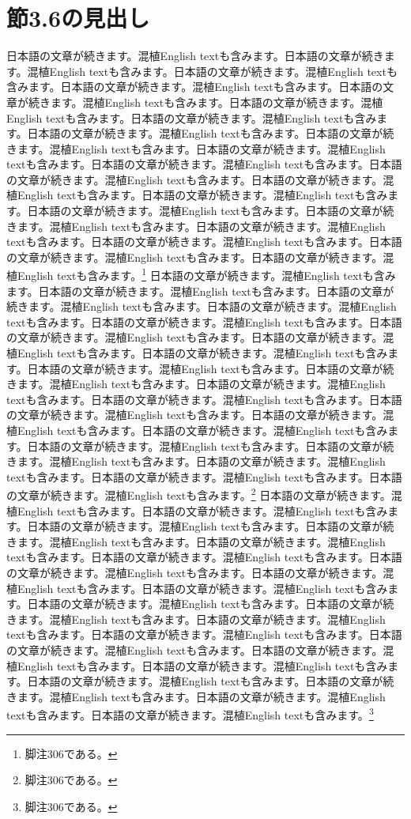 \documentclass[pdflatex,book]{jlreq}
\begin{document}
\section{節3.6の見出し}
日本語の文章が続きます。混植English textも含みます。日本語の文章が続きます。混植English textも含みます。日本語の文章が続きます。混植English textも含みます。日本語の文章が続きます。混植English textも含みます。日本語の文章が続きます。混植English textも含みます。日本語の文章が続きます。混植English textも含みます。日本語の文章が続きます。混植English textも含みます。日本語の文章が続きます。混植English textも含みます。日本語の文章が続きます。混植English textも含みます。日本語の文章が続きます。混植English textも含みます。日本語の文章が続きます。混植English textも含みます。日本語の文章が続きます。混植English textも含みます。日本語の文章が続きます。混植English textも含みます。日本語の文章が続きます。混植English textも含みます。日本語の文章が続きます。混植English textも含みます。日本語の文章が続きます。混植English textも含みます。日本語の文章が続きます。混植English textも含みます。日本語の文章が続きます。混植English textも含みます。日本語の文章が続きます。混植English textも含みます。日本語の文章が続きます。混植English textも含みます。\footnote{脚注306である。}
日本語の文章が続きます。混植English textも含みます。日本語の文章が続きます。混植English textも含みます。日本語の文章が続きます。混植English textも含みます。日本語の文章が続きます。混植English textも含みます。日本語の文章が続きます。混植English textも含みます。日本語の文章が続きます。混植English textも含みます。日本語の文章が続きます。混植English textも含みます。日本語の文章が続きます。混植English textも含みます。日本語の文章が続きます。混植English textも含みます。日本語の文章が続きます。混植English textも含みます。日本語の文章が続きます。混植English textも含みます。日本語の文章が続きます。混植English textも含みます。日本語の文章が続きます。混植English textも含みます。日本語の文章が続きます。混植English textも含みます。日本語の文章が続きます。混植English textも含みます。日本語の文章が続きます。混植English textも含みます。日本語の文章が続きます。混植English textも含みます。日本語の文章が続きます。混植English textも含みます。日本語の文章が続きます。混植English textも含みます。日本語の文章が続きます。混植English textも含みます。\footnote{脚注306である。}
日本語の文章が続きます。混植English textも含みます。日本語の文章が続きます。混植English textも含みます。日本語の文章が続きます。混植English textも含みます。日本語の文章が続きます。混植English textも含みます。日本語の文章が続きます。混植English textも含みます。日本語の文章が続きます。混植English textも含みます。日本語の文章が続きます。混植English textも含みます。日本語の文章が続きます。混植English textも含みます。日本語の文章が続きます。混植English textも含みます。日本語の文章が続きます。混植English textも含みます。日本語の文章が続きます。混植English textも含みます。日本語の文章が続きます。混植English textも含みます。日本語の文章が続きます。混植English textも含みます。日本語の文章が続きます。混植English textも含みます。日本語の文章が続きます。混植English textも含みます。日本語の文章が続きます。混植English textも含みます。日本語の文章が続きます。混植English textも含みます。日本語の文章が続きます。混植English textも含みます。日本語の文章が続きます。混植English textも含みます。日本語の文章が続きます。混植English textも含みます。\footnote{脚注306である。}
\end{document}
